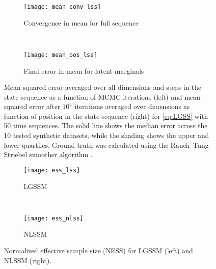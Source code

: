 \begin{figure*}[t]
	\centering
	\begin{subfigure}[t]{0.49\textwidth}
		\texttt{[image: mean\_conv\_lss]}
		\caption{Convergence in mean for full sequence}
		\label{fig:meanConv}
	\end{subfigure}
	~  %
	\begin{subfigure}[t]{0.49\textwidth}
		\texttt{[image: mean\_pos\_lss]}
		\caption{Final error in mean for latent marginals}
		\label{fig:meanPos}
	\end{subfigure}
	
	\caption{Mean squared error averaged over all dimensions and steps in the state sequence as a function of MCMC iterations (left) and mean squared error after $10^4$ iterations averaged over dimensions as function of position in the state sequence (right) for \eqref{eq:LGSS} with 50 time sequences.  The solid line shows the median error across the 10 tested synthetic datasets, while the shading shows the upper and lower quartiles.  Ground truth was calculated using the Rauch--Tung--Striebel smoother algorithm \cite{rauch1965maximum}. 
		\label{fig:groundTruth}}
\end{figure*}

\begin{figure*}[t]
	\centering
	\begin{subfigure}[t]{0.49\textwidth}
		\texttt{[image: ess\_lss]}
		\caption{LGSSM}
	\end{subfigure}
	~ %
	\begin{subfigure}[t]{0.49\textwidth}
		\texttt{[image: ess\_nlss]}
		\caption{NLSSM}
	\end{subfigure}
	
	\caption{Normalized effective sample size  (NESS) for LGSSM (left) and NLSSM (right).
		\label{fig:ESS}}
\end{figure*}

